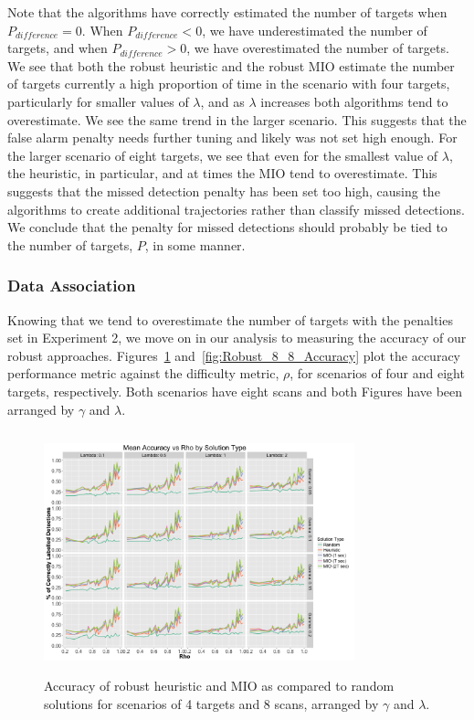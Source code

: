 \documentclass[journal]{IEEEtran}
\begin{document}
Note that the algorithms have correctly estimated the number of targets when $P_{difference} = 0$. When $P_{difference} < 0$, we have underestimated the number of targets, and when $P_{difference} > 0$, we have overestimated the number of targets. We see that both the robust heuristic and the robust MIO estimate the number of targets currently a high proportion of time in the scenario with four targets, particularly for smaller values of $\lambda$, and as $\lambda$ increases both algorithms tend to overestimate. We see the same trend in the larger scenario. This suggests that the false alarm penalty needs further tuning and likely was not set high enough. For the larger scenario of eight targets, we see that even for the smallest value of $\lambda$, the heuristic, in particular, and at times the MIO tend to overestimate. This suggests that the missed detection penalty has been set too high, causing the algorithms to create additional trajectories rather than classify missed detections. We conclude that the penalty for missed detections should probably be tied to the number of targets, $P$, in some manner. 

\subsubsection{Data Association}
Knowing that we tend to overestimate the number of targets with the penalties set in Experiment 2, we move on in our analysis to measuring the accuracy of our robust approaches. Figures~\ref{fig:Robust_4_8_Accuracy} and~\ref{fig:Robust_8_8_Accuracy} plot the accuracy performance metric against the difficulty metric, $\rho$, for scenarios of four and eight targets, respectively. Both scenarios have eight scans and both Figures have been arranged by $\gamma$ and $\lambda$.
\begin{figure}[h]
  \centering
  \includegraphics[width=9cm, height=7cm]{4_8_Accuracy}
  \caption{Accuracy of robust heuristic and MIO as compared to random solutions for scenarios of 4 targets and 8 scans, arranged by $\gamma$ and $\lambda$.}
  \label{fig:Robust_4_8_Accuracy}
\end{figure}
\end{document}
